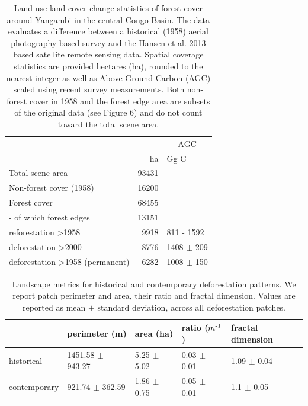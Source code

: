\documentclass[remote sensing,article,submit,moreauthors,pdftex]{mdpi}
\begin{document}
\begin{table}[!h]

\caption{\label{tab:unnamed-chunk-10}Land use land cover change statistics of forest cover around Yangambi in the central Congo Basin. The data evaluates a difference between a historical (1958) aerial photography based survey and the Hansen et al. 2013 based satellite remote sensing data. Spatial coverage statistics are provided hectares (ha), rounded to the nearest integer as well as Above Ground Carbon (AGC) scaled using recent survey measurements. Both non-forest cover in 1958 and the forest edge area are subsets of the original data (see Figure 6) and do not count toward the total scene area.}
\centering
\begin{tabular}[t]{lrl}
\toprule
\multicolumn{2}{c}{ } & \multicolumn{1}{c}{AGC} \\
\cmidrule(l{3pt}r{3pt}){3-3}
  & ha & Gg C\\
\midrule
Total scene area & 93431 & \\
Non-forest cover (1958) & 16200 & \\
Forest cover & 68455 & \\
-  of which forest edges & 13151 & \\
reforestation >1958 & 9918 & 811 - 1592\\
\addlinespace
deforestation >2000 & 8776 & 1408 $\pm$ 209\\
deforestation >1958 (permanent) & 6282 & 1008 $\pm$ 150\\
\bottomrule
\end{tabular}
\end{table}

\begin{table}[!h]

\caption{\label{tab:unnamed-chunk-11}Landscape metrics for historical and contemporary deforestation patterns. We report patch perimeter and area, their ratio and fractal dimension. Values are reported as mean $\pm$ standard deviation, across all deforestation patches.}
\centering
\begin{tabular}[t]{lllll}
\toprule
  & perimeter (m) & area (ha) & ratio ($m\textsuperscript{-1}$) & fractal dimension\\
\midrule
historical & 1451.58 $\pm$ 943.27 & 5.25 $\pm$ 5.02 & 0.03 $\pm$ 0.01 & 1.09 $\pm$ 0.04\\
contemporary & 921.74 $\pm$ 362.59 & 1.86 $\pm$ 0.75 & 0.05 $\pm$ 0.01 & 1.1 $\pm$ 0.05\\
\bottomrule
\end{tabular}
\end{table}
\end{document}
